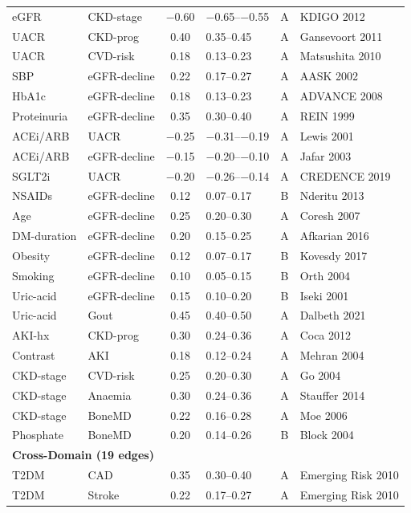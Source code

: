 \documentclass[runningheads]{llncs}
\begin{document}
{\begin{longtable}{@{}p{2.0cm}p{2.0cm}cp{1.4cm}cp{2.8cm}@{}}
\midrule
eGFR & CKD-stage & $-$0.60 & $-$0.65--$-$0.55 & A & KDIGO 2012 \\
UACR & CKD-prog & 0.40 & 0.35--0.45 & A & Gansevoort 2011 \\
UACR & CVD-risk & 0.18 & 0.13--0.23 & A & Matsushita 2010 \\
SBP & eGFR-decline & 0.22 & 0.17--0.27 & A & AASK 2002 \\
HbA1c & eGFR-decline & 0.18 & 0.13--0.23 & A & ADVANCE 2008 \\
Proteinuria & eGFR-decline & 0.35 & 0.30--0.40 & A & REIN 1999 \\
ACEi/ARB & UACR & $-$0.25 & $-$0.31--$-$0.19 & A & Lewis 2001 \\
ACEi/ARB & eGFR-decline & $-$0.15 & $-$0.20--$-$0.10 & A & Jafar 2003 \\
SGLT2i & UACR & $-$0.20 & $-$0.26--$-$0.14 & A & CREDENCE 2019 \\
NSAIDs & eGFR-decline & 0.12 & 0.07--0.17 & B & Nderitu 2013 \\
Age & eGFR-decline & 0.25 & 0.20--0.30 & A & Coresh 2007 \\
DM-duration & eGFR-decline & 0.20 & 0.15--0.25 & A & Afkarian 2016 \\
Obesity & eGFR-decline & 0.12 & 0.07--0.17 & B & Kovesdy 2017 \\
Smoking & eGFR-decline & 0.10 & 0.05--0.15 & B & Orth 2004 \\
Uric-acid & eGFR-decline & 0.15 & 0.10--0.20 & B & Iseki 2001 \\
Uric-acid & Gout & 0.45 & 0.40--0.50 & A & Dalbeth 2021 \\
AKI-hx & CKD-prog & 0.30 & 0.24--0.36 & A & Coca 2012 \\
Contrast & AKI & 0.18 & 0.12--0.24 & A & Mehran 2004 \\
CKD-stage & CVD-risk & 0.25 & 0.20--0.30 & A & Go 2004 \\
CKD-stage & Anaemia & 0.30 & 0.24--0.36 & A & Stauffer 2014 \\
CKD-stage & BoneMD & 0.22 & 0.16--0.28 & A & Moe 2006 \\
Phosphate & BoneMD & 0.20 & 0.14--0.26 & B & Block 2004 \\
\midrule
\multicolumn{6}{l}{\textbf{Cross-Domain (19 edges)}} \\
\midrule
T2DM & CAD & 0.35 & 0.30--0.40 & A & Emerging Risk 2010 \\
T2DM & Stroke & 0.22 & 0.17--0.27 & A & Emerging Risk 2010 \\

\end{longtable}}
\end{document}
